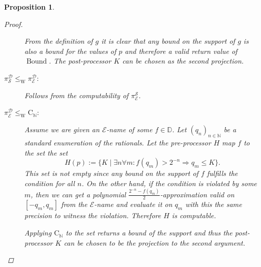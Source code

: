 \documentclass{eptcs-modified}
\newtheorem{proposition}[theorem]{Proposition}
\newcommand{\leqW}{\leq_{\textrm{W}}}
\newcommand{\CCN}{\mathrm{C}_{\NN}}
\newcommand{\NN}{\mathbb{N}}
\newcommand{\DD}{\mathbb{D}}
\newcommand{\EE}{\mathcal E}
\newcommand{\SF}{\mathcal S}
\newcommand{\TF}{\mathcal D}
\newcommand{\Bound}{\operatorname{Bound}}
\begin{document}
\begin{proposition}
\begin{proof}
\begin{description}
						From the definition of $g$ it is clear that any bound on the support of $g$ is also a bound for the values of $p$ and therefore a valid return value of $\Bound$.
						The post-processor $K$ can be chosen as the second projection.
					\item[$\pi_\SF^\TF \leqW \pi_\EE^\TF$:] Follows from the computability of $\pi_\EE^\SF$.
					\item[$\pi_\EE^\TF \leqW \CCN$:]
						Assume we are given an $\EE$-name of some $f\in\DD$.
						Let $(q_n)_{n\in\NN}$ be a standard enumeration of the rationals.
						Let the pre-processor $H$ map $f$ to the set the set
						\[ H(p) := \{K\mid\exists n \forall m: f(q_m) > 2^{-n} \Rightarrow q_m\leq K\}. \]
						This set is not empty since any bound on the support of $f$ fulfills the condition for all $n$.
						On the other hand, if the condition is violated by some $m$, then we can get a polynomial $\frac{2^{-n}-f(q_m)}2$-approximation valid on $[-q_m,q_m]$ from the $\EE$-name and evaluate it on $q_m$ with this the same precision to witness the violation.
						Therefore $H$ is computable.

						Applying $\CCN$ to the set returns a bound of the support and thus the post-processor $K$ can be chosen to be the projection to the second argument.
					\end{description}
				\end{proof}
			\end{proposition}
\end{document}
